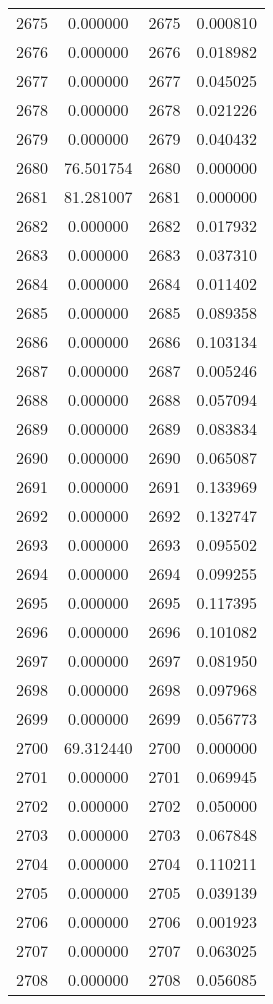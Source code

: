 \documentclass[12pt]{article}
\begin{document}
\begin{longtable}{@{}cccc@{}}
2675 & 0.000000 & 2675 & 0.000810 \\
2676 & 0.000000 & 2676 & 0.018982 \\
2677 & 0.000000 & 2677 & 0.045025 \\
2678 & 0.000000 & 2678 & 0.021226 \\
2679 & 0.000000 & 2679 & 0.040432 \\
2680 & 76.501754 & 2680 & 0.000000 \\
2681 & 81.281007 & 2681 & 0.000000 \\
2682 & 0.000000 & 2682 & 0.017932 \\
2683 & 0.000000 & 2683 & 0.037310 \\
2684 & 0.000000 & 2684 & 0.011402 \\
2685 & 0.000000 & 2685 & 0.089358 \\
2686 & 0.000000 & 2686 & 0.103134 \\
2687 & 0.000000 & 2687 & 0.005246 \\
2688 & 0.000000 & 2688 & 0.057094 \\
2689 & 0.000000 & 2689 & 0.083834 \\
2690 & 0.000000 & 2690 & 0.065087 \\
2691 & 0.000000 & 2691 & 0.133969 \\
2692 & 0.000000 & 2692 & 0.132747 \\
2693 & 0.000000 & 2693 & 0.095502 \\
2694 & 0.000000 & 2694 & 0.099255 \\
2695 & 0.000000 & 2695 & 0.117395 \\
2696 & 0.000000 & 2696 & 0.101082 \\
2697 & 0.000000 & 2697 & 0.081950 \\
2698 & 0.000000 & 2698 & 0.097968 \\
2699 & 0.000000 & 2699 & 0.056773 \\
2700 & 69.312440 & 2700 & 0.000000 \\
2701 & 0.000000 & 2701 & 0.069945 \\
2702 & 0.000000 & 2702 & 0.050000 \\
2703 & 0.000000 & 2703 & 0.067848 \\
2704 & 0.000000 & 2704 & 0.110211 \\
2705 & 0.000000 & 2705 & 0.039139 \\
2706 & 0.000000 & 2706 & 0.001923 \\
2707 & 0.000000 & 2707 & 0.063025 \\
2708 & 0.000000 & 2708 & 0.056085 \\

\end{longtable}
\end{document}
